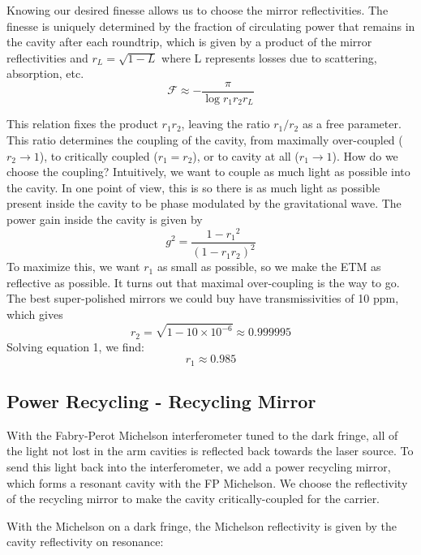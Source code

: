 Knowing our desired finesse allows us to choose the mirror reflectivities.
The finesse is uniquely determined by the fraction of circulating
power that remains in the cavity after each roundtrip, which is given
by a product of the mirror reflectivities and $r_{L}=\sqrt{1-L}$
where L represents losses due to scattering, absorption, etc. 
\begin{equation}
\mathcal{F}\approx-\frac{\pi}{\log r_{1}r_{2}r_{L}}
\end{equation}

This relation fixes the product $r_{1}r_{2}$, leaving the ratio $r_{1}/r_{2}$
as a free parameter. This ratio determines the coupling of the cavity,
from maximally over-coupled ($r_{2}\rightarrow1$), to critically
coupled ($r_{1}=r_{2}$), or to cavity at all ($r_{1}\rightarrow1$).
How do we choose the coupling? Intuitively, we want to couple as much
light as possible into the cavity. In one point of view, this is so
there is as much light as possible present inside the cavity to be
phase modulated by the gravitational wave. The power gain inside the
cavity is given by
\[
g^{2}=\frac{1-r_{1}{}^{2}}{\left(1-r_{1}r_{2}\right)^{2}}
\]
To maximize this, we want $r_{1}$ as small as possible, so we make
the ETM as reflective as possible. It turns out that maximal over-coupling
is the way to go. The best super-polished mirrors we could buy have
transmissivities of 10 ppm, which gives
\begin{equation}
r_{2}=\sqrt{{1-10\times10^{-6}}}\approx0.999995
\end{equation}
Solving equation 1, we find:
\begin{equation}
r_{1}\approx0.985
\end{equation}

\subsection*{Power Recycling - Recycling Mirror}

With the Fabry-Perot Michelson interferometer tuned to the dark fringe, all
of the light not lost in the arm cavities is reflected back towards
the laser source. To send this light back into the interferometer,
we add a power recycling mirror, which forms a resonant cavity with
the FP Michelson. We choose the reflectivity of the recycling mirror
to make the cavity critically-coupled for the carrier. 

With the Michelson on a dark fringe, the Michelson reflectivity is
given by the cavity reflectivity on resonance:

